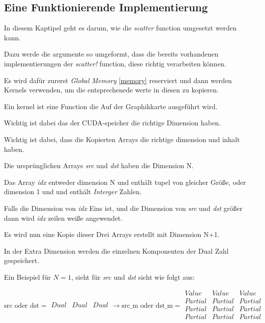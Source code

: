 \subsection{Eine Funktionierende Implementierung}

In diesem Kaptipel geht es darum, wie die \textit{scatter} function umgesetzt werden kann.

Dazu werde die argumente so umgeformt, 
dass die bereits vorhandenen implementierungen der \textit{scatter!} function, 
diese richtig verarbeiten können.

Es wird dafür zurerst \textit{Global Memory} \ref{memory} reserviert und dann werden Kernels verwenden, 
um die entsprechenede werte in diesen zu kopieren.

Ein kernel ist eine Function die Auf der Graphikkarte ausgeführt wird.

Wichtig ist dabei das der CUDA-speicher die richtige Dimension haben. 

Wichtig ist dabei, dass die Kopierten Arrays die richtige dimension und inhalt haben. 

Die ursprünglichen Arrays \textit{src} und \textit{dst} haben die Dimension N.

Das Array \textit{idx} entweder dimension N und enthält tupel von gleicher Größe,
oder dimension 1 und und enthält \textit{Interger} Zahlen.

Falls die Dimension von \textit{idx} Eins ist, und die Dimension von \textit{src}
und \textit{dst} größer dann wird \textit{idx} zeilen weiße angewendet.

Es wird nun eine Kopie dieser Drei Arrays erstellt mit Dimension N+1.

In der Extra Dimension werden die einzelnen Komponenten der Dual Zahl gespeichert.

Ein Beispiel für $N = 1$, sieht für \textit{src} und \textit{dst} sieht wie folgt aus:

\begin{equation}
\text{src oder dst} = 
\begin{matrix}
Dual & Dual & Dual\\
\end{matrix}
\rightarrow
\text{src\_m oder dst\_m} = 
\begin{matrix}
Value   & Value   & Value   \\
Partial & Partial & Partial \\
Partial & Partial & Partial \\
Partial & Partial & Partial \\
\end{matrix}
\end{equation}

